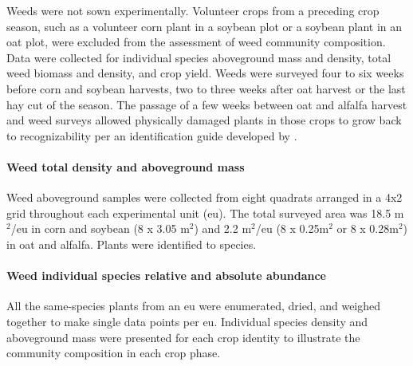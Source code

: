 \documentclass[
]{article}
\begin{document}
\begin{landscape}
\begin{table}
{\begin{threeparttable}
\begin{tablenotes}[para]
\end{tablenotes}
\end{threeparttable}}
\end{table}
\end{landscape}

Weeds were not sown experimentally. Volunteer crops from a preceding crop season, such as a volunteer corn plant in a soybean plot or a soybean plant in an oat plot, were excluded from the assessment of weed community composition. Data were collected for individual species aboveground mass and density, total weed biomass and density, and crop yield. Weeds were surveyed four to six weeks before corn and soybean harvests, two to three weeks after oat harvest or the last hay cut of the season. The passage of a few weeks between oat and alfalfa harvest and weed surveys allowed physically damaged plants in those crops to grow back to recognizability per an identification guide developed by \citet{uvaWeedsNortheast1997}.

\hypertarget{weed-total-density-and-aboveground-mass}{%
\paragraph*{Weed total density and aboveground mass}\label{weed-total-density-and-aboveground-mass}}

Weed aboveground samples were collected from eight quadrats arranged in a 4x2 grid throughout each experimental unit (eu). The total surveyed area was 18.5 m\(^2\)/eu in corn and soybean (8 x 3.05 m\(^2\)) and 2.2 m\(^2\)/eu (8 x 0.25m\(^2\) or 8 x 0.28m\(^2\)) in oat and alfalfa. Plants were identified to species.

\hypertarget{weed-individual-species-relative-and-absolute-abundance}{%
\paragraph*{Weed individual species relative and absolute abundance}\label{weed-individual-species-relative-and-absolute-abundance}}

All the same-species plants from an eu were enumerated, dried, and weighed together to make single data points per eu. Individual species density and aboveground mass were presented for each crop identity to illustrate the community composition in each crop phase.
\end{document}
